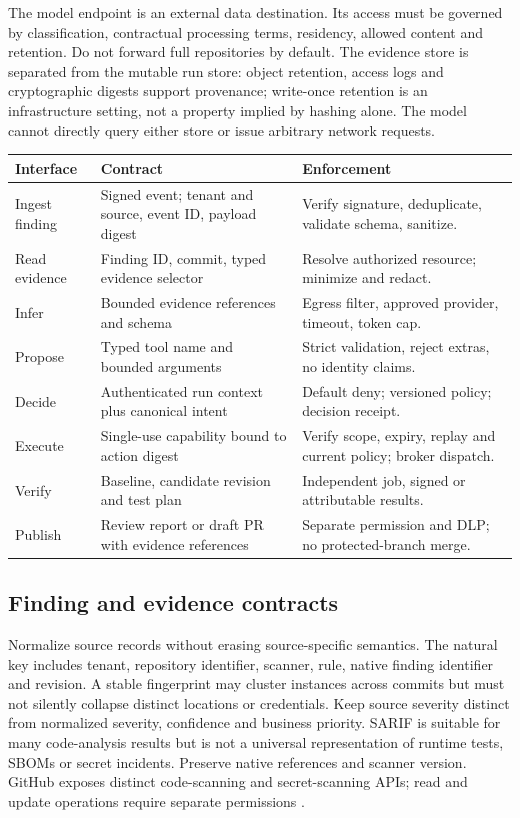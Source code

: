 \documentclass[11pt,letterpaper]{article}
\begin{document}
The model endpoint is an external data destination. Its access must be governed by classification, contractual processing terms, residency, allowed content and retention. Do not forward full repositories by default. The evidence store is separated from the mutable run store: object retention, access logs and cryptographic digests support provenance; write-once retention is an infrastructure setting, not a property implied by hashing alone. The model cannot directly query either store or issue arbitrary network requests.

\begin{longtable}{@{}>{\raggedright\arraybackslash}p{.22\linewidth}>{\raggedright\arraybackslash}p{.33\linewidth}>{\raggedright\arraybackslash}p{.37\linewidth}@{}}
\toprule Interface & Contract & Enforcement\\\midrule\endhead
Ingest finding & Signed event; tenant and source, event ID, payload digest & Verify signature, deduplicate, validate schema, sanitize.\\
Read evidence & Finding ID, commit, typed evidence selector & Resolve authorized resource; minimize and redact.\\
Infer & Bounded evidence references and schema & Egress filter, approved provider, timeout, token cap.\\
Propose & Typed tool name and bounded arguments & Strict validation, reject extras, no identity claims.\\
Decide & Authenticated run context plus canonical intent & Default deny; versioned policy; decision receipt.\\
Execute & Single-use capability bound to action digest & Verify scope, expiry, replay and current policy; broker dispatch.\\
Verify & Baseline, candidate revision and test plan & Independent job, signed or attributable results.\\
Publish & Review report or draft PR with evidence references & Separate permission and DLP; no protected-branch merge.\\
\bottomrule
\end{longtable}

\subsection{Finding and evidence contracts}
Normalize source records without erasing source-specific semantics. The natural key includes tenant, repository identifier, scanner, rule, native finding identifier and revision. A stable fingerprint may cluster instances across commits but must not silently collapse distinct locations or credentials. Keep source severity distinct from normalized severity, confidence and business priority. SARIF is suitable for many code-analysis results but is not a universal representation of runtime tests, SBOMs or secret incidents. Preserve native references and scanner version. GitHub exposes distinct code-scanning and secret-scanning APIs; read and update operations require separate permissions \cite{ghcode,ghsecret}.
\end{document}
